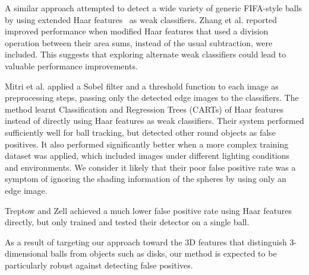 \documentclass{sig-alternate-05-2015}
\newcommand{\citep}[1]{\cite{#1}}
\newcommand{\citet}[1]{\cite{#1}}
\begin{document}
{		A similar approach	\citet{zhang2013novel} attempted to detect a wide variety of generic FIFA-style balls by using extended Haar features~\citep{Lienhart2002extended} as weak classifiers. Zhang et al. \citet{zhang2013novel} reported improved performance when modified Haar features that used a division operation between their area sums, instead of the usual subtraction, were included. This suggests that exploring alternate weak classifiers could lead to valuable performance improvements.

		Mitri et al. \citet{mitri2004fast} applied a Sobel filter and a threshold function to each image as preprocessing steps, passing only the detected edge images to the classifiers. The method learnt Classification and Regression Trees (CARTs) of Haar features instead of directly using Haar features as weak classifiers. Their system performed sufficiently well for ball tracking, but detected other round objects as false positives. It also performed significantly better when a more complex training dataset was applied, which included images under different lighting conditions and environments. We consider it likely that their poor false positive rate was a symptom of ignoring the shading information of the spheres by using only an edge image.

		Treptow and Zell \citet{treptow2004filter} achieved a much lower false positive rate using Haar features directly, but only trained and tested their detector on a single ball.

		As a result of targeting our approach toward the 3D features that distinguish 3-dimensional balls from objects such as disks, our method is expected to be particularly robust against detecting false positives.

	}
\end{document}
